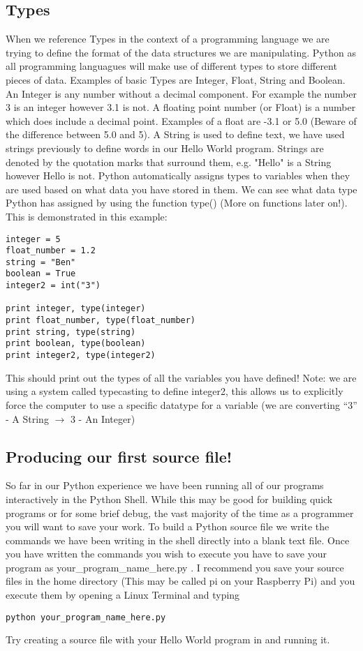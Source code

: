 \documentclass[twocolumn]{article}
\begin{document}
\subsection{Types}
When we reference Types in the context of a programming language we are trying to define the format of the data structures we are manipulating. Python as all programming languagues will make use of different types to store different pieces of data. Examples of basic Types are Integer, Float, String and Boolean. An Integer is any number without a decimal component. For example the number 3 is an integer however 3.1 is not. A floating point number (or Float) is a number which does include a decimal point. Examples of a float are -3.1 or 5.0 (Beware of the difference between 5.0 and 5). A String is used to define text, we have used strings previously to define words in our Hello World program. Strings are denoted by the quotation marks that surround them, e.g. "Hello" is a String however Hello is not. Python automatically assigns types to variables when they are used based on what data you have stored in them. We can see what data type Python has assigned by using the function type() (More on functions later on!). This is demonstrated in this example:
\begin{lstlisting}
integer = 5
float_number = 1.2
string = "Ben"
boolean = True
integer2 = int("3")

print integer, type(integer)
print float_number, type(float_number)
print string, type(string)
print boolean, type(boolean)
print integer2, type(integer2)
\end{lstlisting}
This should print out the types of all the variables you have defined! Note: we are using a system called typecasting to define integer2, this allows us to explicitly force the computer to use a specific datatype for a variable (we are converting ``3'' - A String  $\rightarrow$ 3 - An Integer)
\subsection{Producing our first source file!}
So far in our Python experience we have been running all of our programs interactively in the Python Shell. While this may be good for building quick programs or for some brief debug, the vast majority of the time as a programmer you will want to save your work. To build a Python source file we write the commands we have been writing in the shell directly into a blank text file. Once you have written the commands you wish to execute you have to save your program as your\_program\_name\_here.py . I recommend you save your source files in the home directory (This may be called pi on your Raspberry Pi) and you execute them by opening a Linux Terminal 
 and typing
\begin{lstlisting}
python your_program_name_here.py
\end{lstlisting}
Try creating a source file with your Hello World program in and running it.
\end{document}
